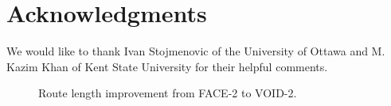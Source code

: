 \documentclass[conference]{IEEEtran}
\begin{document}
\section*{Acknowledgments} We would like to thank Ivan Stojmenovic
of the University of Ottawa and M. Kazim Khan of Kent State University
for their helpful comments.

\suppressfloats[t]

\begin{figure}[t]
\center {}
\caption{Route length improvement from FACE-2 to VOID-2.}
\label{figCompare}
\end{figure}





\end{document}
